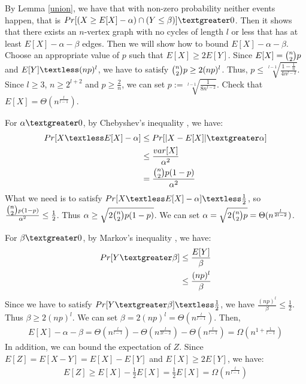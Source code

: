 By Lemma \ref{union}, we have that with non-zero probability neither events happen, that is $Pr[(X\ge E[X]-\alpha)\cap (Y \le \beta)]\textgreater 0$. Then it shows that there exists an $n$-vertex graph with no cycles of length $l$ or less that has at least $E[X]-\alpha-\beta$ edges. 
Then we will show how to bound $E[X]-\alpha-\beta$.
Choose an appropriate value of $p$ such that $E[X] \ge 2E[Y]$. Since $E[X]=\tbinom{n}{2}p$ and $E[Y]\textless (np)^l$, we have to satisfy $\tbinom{n}{2}p \ge 2(np)^l$. Thus, $p\le  \sqrt[l-1]{\frac{1-\frac{1}{n}}{4n^{l-2}}}$. Since $l\ge 3$, $n\ge 2^{l+2}$ and $p\ge \frac{2}{n}$, we can set $p:=\sqrt[l-1]{\frac{1}{8n^{l-2}}}$. Check that $E[X]=\Theta (n^\frac{l}{l-1})$.%

For $\alpha \textgreater 0$, by 
Chebyshev's inequality
, we have:
\begin{align}
    \nonumber Pr[X\textless E[X]-\alpha]&\le Pr[|X-E[X]|\textgreater \alpha]\\ 
    \nonumber &\le \frac{var[X]}{\alpha^2}\\
    \nonumber &=\frac{\tbinom{n}{2}p(1-p)}{\alpha^2}
\end{align}
What we need is to satisfy $Pr[X\textless E[X]-\alpha] \textless \frac{1}{2}$, so $\frac{\tbinom{n}{2}p(1-p)}{\alpha^2}\le \frac{1}{2} $. Thus $\alpha \ge \sqrt{2\tbinom{n}{2}p(1-p)}$. We can set $\alpha = \sqrt{2\tbinom{n}{2}p}=\Theta(n^{\frac{l}{2l-2}})$.

For $\beta \textgreater 0$, by 
Markov's inequality
, we have: 
\begin{align}
    \nonumber Pr[Y \textgreater \beta] &\le \frac{E[Y]}{\beta}\\
    \nonumber & \le \frac{(np)^l}{\beta} 
\end{align}
Since we have to satisfy $Pr[Y \textgreater \beta]\textless \frac{1}{2}$, we have $\frac{(np)^l}{\beta} \le \frac{1}{2}$. Thus $\beta \ge 2(np)^l$. We can set $\beta = 2(np)^l = \Theta (n^{\frac{l}{l-1}})$.
Then,
\begin{align}
    \nonumber E[X]-\alpha-\beta = \Theta (n^\frac{l}{l-1}) - \Theta(n^{\frac{l}{2l-2}}) - \Theta (n^{\frac{l}{l-1}})=\Omega (n^{1+\frac{1}{l-1}})
\end{align}
In addition, we can bound the expectation of $Z$.
Since $E[Z]=E[X-Y]=E[X]-E[Y]$ and $E[X]\ge 2E[Y]$, we have:
\begin{align}
    \nonumber E[Z]\ge E[X]-\frac{1}{2}E[X]=\frac{1}{2}E[X]=\Omega (n^\frac{l}{l-1})
\end{align}
